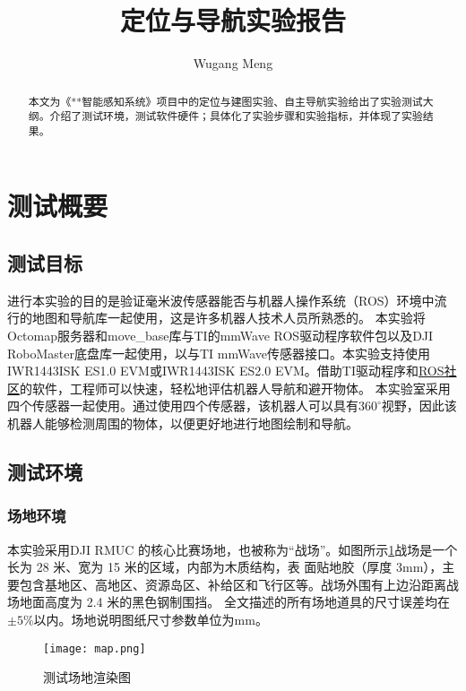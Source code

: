 \documentclass[lang=cn,11pt,a4paper]{elegantpaper}
\title{定位与导航实验报告}
\author{Wugang Meng}
\institute{哈尔滨工业大学(威海)}
\date{\zhtoday}
\begin{document}
\maketitle

\begin{abstract}
本文为《**智能感知系统》项目中的定位与建图实验、自主导航实验给出了实验测试大纲。介绍了测试环境，测试软件硬件；具体化了实验步骤和实验指标，并体现了实验结果。
\end{abstract}



\section{测试概要}

\subsection{测试目标}
进行本实验的目的是验证毫米波传感器能否与机器人操作系统（ROS）环境中流行的地图和导航库一起使用，这是许多机器人技术人员所熟悉的。
本实验将Octomap服务器和move\_base库与TI的mmWave ROS驱动程序软件包以及DJI RoboMaster底盘库一起使用，以与TI mmWave传感器接口。本实验支持使用IWR1443ISK ES1.0 EVM或IWR1443ISK ES2.0 EVM。借助TI驱动程序和\href{ros.org}{ROS社区}的软件，工程师可以快速，轻松地评估机器人导航和避开物体。
本实验室采用四个传感器一起使用。通过使用四个传感器，该机器人可以具有$360^{\circ}$视野，因此该机器人能够检测周围的物体，以便更好地进行地图绘制和导航。

\subsection{测试环境}
\subsubsection{场地环境}
本实验采用DJI RMUC 的核心比赛场地，也被称为“战场”。如图所示\ref{fig:map}战场是一个长为 28 米、宽为 15 米的区域，内部为木质结构，表
面贴地胶（厚度 3mm），主要包含基地区、高地区、资源岛区、补给区和飞行区等。战场外围有上边沿距离战场地面高度为 2.4 米的黑色钢制围挡。
全文描述的所有场地道具的尺寸误差均在$±5\%$以内。场地说明图纸尺寸参数单位为mm。

\begin{figure}[htbp]
  \centering
  \texttt{[image: map.png]}
  \caption{测试场地渲染图}
  \label{fig:map}
\end{figure}
\end{document}
